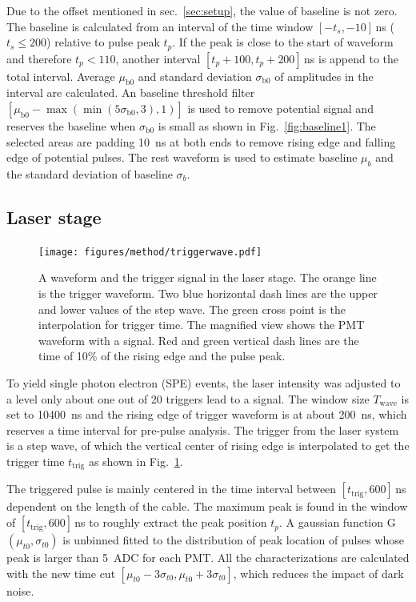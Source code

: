 Due to the offset mentioned in sec.~\ref{sec:setup}, the value of baseline is not zero. The baseline is calculated from an interval of the time window $[-t_s,-10]$\,ns ($t_s\leq200$) relative to pulse peak $t_p$. If the peak is close to the start of waveform and therefore $t_p < 110$, another interval $[t_p+100,t_p+200]$\,ns is append to the total interval. Average $\mu_{\mathrm{b0}}$ and standard deviation $\sigma_{\mathrm{b0}}$ of amplitudes in the interval are calculated. An baseline threshold filter $[\mu_{\mathrm{b0}}-\max(\min(5\sigma_{\mathrm{b0}},3),1)]$ is used to remove potential signal and reserves the baseline when $\sigma_{\mathrm{b0}}$ is small as shown in Fig.~\ref{fig:baseline1}. The selected areas are padding \SI{10}{ns} at both ends to remove rising edge and falling edge of potential pulses. The rest waveform is used to estimate baseline $\mu_b$ and the standard deviation of baseline $\sigma_b$.

\subsection{Laser stage}
\label{sec:laserstage}

\begin{figure}[!htbp]
    \centering
    \texttt{[image: figures/method/triggerwave.pdf]}
    \caption{A waveform and the trigger signal in the laser stage. The orange line is the trigger waveform. Two blue horizontal dash lines are the upper and lower values of the step wave. The green cross point is the interpolation for trigger time. The magnified view shows the PMT waveform with a signal. Red and green vertical dash lines are the time of 10\% of the rising edge and the pulse peak.}
    \label{fig:triggertime}
\end{figure}

To yield single photon electron (SPE) events, the laser intensity was adjusted to a level only about one out of 20 triggers lead to a signal. The window size $T_{\mathrm{wave}}$ is set to \SI{10400}{ns} and the rising edge of trigger waveform is at about \SI{200}{ns}, which reserves a time interval for pre-pulse analysis. The trigger from the laser system is a step wave, of which the vertical center of rising edge is interpolated to get the trigger time $t_{\mathrm{trig}}$ as shown in Fig.~\ref{fig:triggertime}.

The triggered pulse is mainly centered in the time interval between $[t_{\mathrm{trig}}, 600]$\,ns dependent on the length of the cable. The maximum peak is found in the window of $[t_{\mathrm{trig}}, 600]$\,ns to roughly extract the peak position $t_p$. A gaussian function G$(\mu_{t0},\sigma_{t0})$ is unbinned fitted to the distribution of peak location of pulses whose peak is larger than \SI{5}{ADC} for each PMT.%
 All the characterizations are calculated with the new time cut $[\mu_{t0}-3\sigma_{t0}, \mu_{t0}+3\sigma_{t0}]$, which reduces the impact of dark noise.

